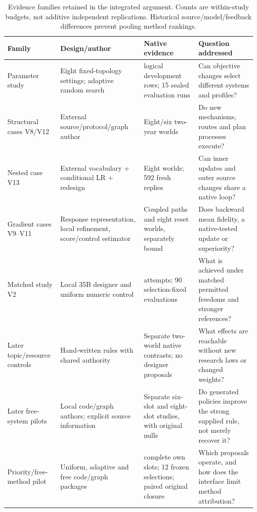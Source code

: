 \begin{table}[t]\centering\small
\caption{Evidence families retained in the integrated argument. Counts are
within-study budgets, not additive independent replications. Historical
source/model/feedback differences prevent pooling method rankings.}
\label{tab:integrated-studies}
\begin{tabular}{@{}>{\raggedright\arraybackslash}p{.19\linewidth}>{\raggedright\arraybackslash}p{.21\linewidth}>{\raggedright\arraybackslash}p{.25\linewidth}>{\raggedright\arraybackslash}p{.25\linewidth}@{}}
\toprule
Family & Design/author & Native evidence & Question addressed \\
\midrule
Parameter study & Eight fixed-topology settings; adaptive random search & 45 logical development rows; 15 sealed evaluation runs & Can objective changes select different systems and profiles? \\
Structural cases V8/V12 & External source/protocol/graph author & Eight/six two-year worlds & Do new mechanisms, routes and plan processes execute? \\
Nested case V13 & External vocabulary + conditional LR + redesign & Eight worlds; 592 fresh replies & Can inner updates and outer source changes share a native loop? \\
Gradient cases V9--V11 & Response representation, local refinement, score/control estimator & Coupled paths and eight reset worlds, separately bound & Does backward mean fidelity, a native-tested update or superiority? \\
Matched study V2 & Local 35B designer and uniform numeric control & 120 attempts; 90 selection-fixed evaluations & What is achieved under matched permitted freedoms and stronger references? \\
Later topic/resource controls & Hand-written rules with shared authority & Separate two-world native contrasts; no designer proposals & What effects are reachable without new research laws or changed weights? \\
Later free-system pilots & Local code/graph authors; explicit source information & Separate six-slot and eight-slot studies, with original nulls & Do generated policies improve the strong supplied rule, not merely recover it? \\
Priority/free-method pilot & Uniform, adaptive and free code/graph packages & 24 complete own slots; 12 frozen selections; paired original closure & Which proposals operate, and how does the interface limit method attribution? \\
\bottomrule
\end{tabular}\end{table}

